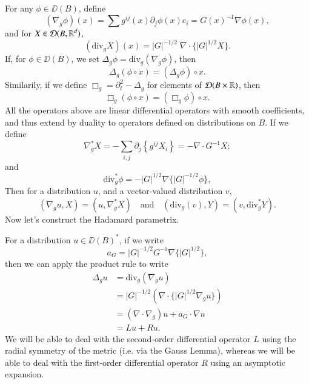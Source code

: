For any $\phi \in \DD(B)$, define
%
\[ (\nabla_g \phi)(x) = \sum g^{ij}(x) \partial_j \phi(x) e_i = G(x)^{-1} \nabla \phi(x), \]
%
and for $X \in \operatorname{\mathcal{D}}(B,\operatorname{\mathbb{R}}^d)$,
%
\[ (\text{div}_g X)(x) = |G|^{-1/2}\; \nabla \cdot \{ |G|^{1/2} X \}. \]
%
If, for $\phi \in \DD(B)$, we set $\Delta_g \phi = \text{div}_g ( \nabla_g \phi )$, then
%
\[ \Delta_g (\phi \circ x) = (\Delta_g \phi) \circ x. \]
%
Similarily, if we define $\Box_g = \partial_t^2 - \Delta_g$ for elements of $\operatorname{\mathcal{D}}(B \times \operatorname{\mathbb{R}})$, then
%
\[ \Box_g ( \phi \circ x ) = (\Box_g \phi) \circ x. \]
%
All the operators above are linear differential operators with smooth coefficients, and thus extend by duality to operators defined on distributions on $B$. If we define
%
\[ \nabla_g^* X = - \sum_{i,j} \partial_j \left\{ g^{ij} X_i \right\} = - \nabla \cdot G^{-1} X; \]
%
and
%
\[ \text{div}_g^* \phi = - |G|^{1/2} \nabla \{ |G|^{-1/2} \phi \}, \]%
%
Then for a distribution $u$, and a vector-valued distribution $v$,
%
\[ ( \nabla_g u, X ) = ( u, \nabla_g^* X ) \quad\text{and}\quad ( \text{div}_g(v), Y ) = ( v, \text{div}_g^* Y ). \]
%
Now let's construct the Hadamard parametrix.

For a distribution $u \in \DD(B)^*$, if we write
%
\[ a_G = |G|^{-1/2} G^{-1} \nabla \{ |G|^{1/2} \}, \]
%
then we can apply the product rule to write
%
\begin{align*}
    \Delta_g u &= \text{div}_g(\nabla_g u)\\
    &= |G|^{-1/2} ( \nabla \cdot \{ |G|^{1/2} \nabla_g u \} )\\
    &= (\nabla \cdot \nabla_g) u + a_G \cdot \nabla u\\
    &= L u + R u.
\end{align*}
%
We will be able to deal with the second-order differential operator $L$ using the radial symmetry of the metric (i.e. via the Gauss Lemma), whereas we will be able to deal with the first-order differential operator $R$ using an asymptotic expansion.

